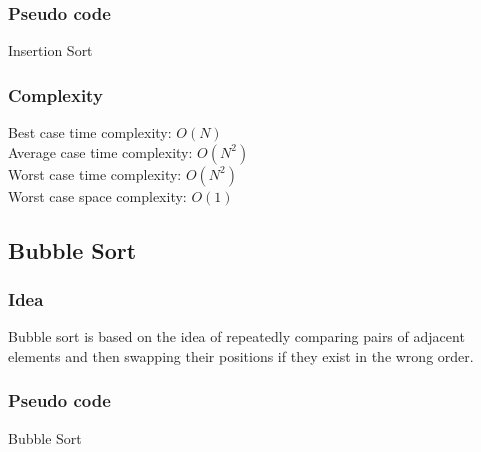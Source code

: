 \documentclass[11pt,a4paper]{article}
\newcommand\tab[1][1cm]{\hspace*{#1}}
\begin{document}
\subsubsection*{Pseudo code}
\begin{algorithm2e}
  \SetAlgoLined
  \caption{Insertion Sort}
\end{algorithm2e}
\newpage
\subsubsection*{Complexity}
Best case time complexity: $O(N)$ \\
Average case time complexity: $O(N^2)$\\
Worst case time complexity: $O(N^2)$ \\
Worst case space complexity: $O(1)$

\subsection{Bubble Sort}
\subsubsection*{Idea}
\tab Bubble sort is based on the idea of repeatedly comparing pairs of adjacent elements and then 
swapping their positions if they exist in the wrong order.

\subsubsection*{Pseudo code}
\begin{algorithm2e}
  \SetAlgoLined
  \caption{Bubble Sort}
\end{algorithm2e}
\end{document}
